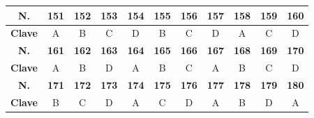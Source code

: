 \begin{center}
\begin{tabular}{|c|c|c|c|c|c|c|c|c|c|c|}
\hline
\textbf{N.} & \textbf{151} & \textbf{152} & \textbf{153} & \textbf{154} & \textbf{155} & \textbf{156} & \textbf{157} & \textbf{158} & \textbf{159} & \textbf{160} \\
\hline
\textbf{Clave} & A & B & C & D & B & C & D & A & C & D \\
\hline
\textbf{N.} & \textbf{161} & \textbf{162} & \textbf{163} & \textbf{164} & \textbf{165} & \textbf{166} & \textbf{167} & \textbf{168} & \textbf{169} & \textbf{170} \\
\hline
\textbf{Clave} & A & B & D & A & B & C & A & B & C & D \\
\hline
\textbf{N.} & \textbf{171} & \textbf{172} & \textbf{173} & \textbf{174} & \textbf{175} & \textbf{176} & \textbf{177} & \textbf{178} & \textbf{179} & \textbf{180} \\
\hline
\textbf{Clave} & B & C & D & A & C & D & A & B & D & A \\
\hline
\end{tabular}
\end{center}
